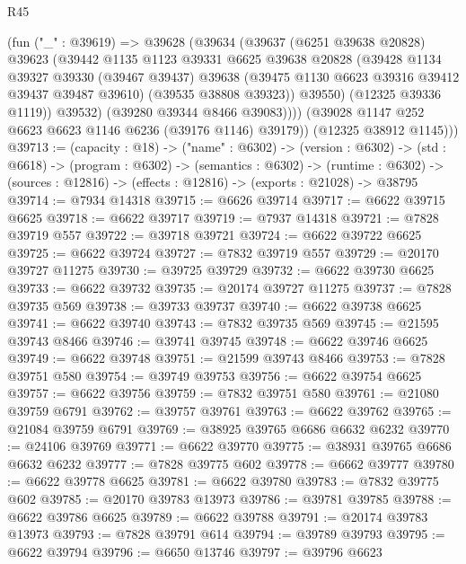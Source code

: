 \begin{lexlean}{R45}
\begin{coremodule}
{              (fun ("_" : @39619) =>
              @39628
                (@39634
                  (@39637
                    (@6251 @39638 @20828)
                    @39623
                    (@39442
                      @1135
                      @1123
                      @39331
                      @6625
                      @39638
                      @20828
                      (@39428
                        @1134
                        @39327
                        @39330
                        (@39467 @39437)
                        @39638
                        (@39475 @1130 @6623 @39316 @39412 @39437 @39487 @39610)
                        (@39535 @38808 @39323))
                      @39550)
                    (@12325 @39336 @1119))
                  @39532)
                (@39280 @39344 @8466 @39083))))
          (@39028 @1147 @252 @6623 @6623 @1146 @6236 (@39176 @1146) @39179))
        (@12325 @38912 @1145)))
@39713 := (capacity : @18) ->
  ("name" : @6302) ->
  (version : @6302) ->
  (std : @6618) ->
  (program : @6302) ->
  (semantics : @6302) ->
  (runtime : @6302) -> (sources : @12816) -> (effects : @12816) -> (exports : @21028) -> @38795
@39714 := @7934 @14318
@39715 := @6626 @39714
@39717 := @6622 @39715 @6625
@39718 := @6622 @39717
@39719 := @7937 @14318
@39721 := @7828 @39719 @557
@39722 := @39718 @39721
@39724 := @6622 @39722 @6625
@39725 := @6622 @39724
@39727 := @7832 @39719 @557
@39729 := @20170 @39727 @11275
@39730 := @39725 @39729
@39732 := @6622 @39730 @6625
@39733 := @6622 @39732
@39735 := @20174 @39727 @11275
@39737 := @7828 @39735 @569
@39738 := @39733 @39737
@39740 := @6622 @39738 @6625
@39741 := @6622 @39740
@39743 := @7832 @39735 @569
@39745 := @21595 @39743 @8466
@39746 := @39741 @39745
@39748 := @6622 @39746 @6625
@39749 := @6622 @39748
@39751 := @21599 @39743 @8466
@39753 := @7828 @39751 @580
@39754 := @39749 @39753
@39756 := @6622 @39754 @6625
@39757 := @6622 @39756
@39759 := @7832 @39751 @580
@39761 := @21080 @39759 @6791
@39762 := @39757 @39761
@39763 := @6622 @39762
@39765 := @21084 @39759 @6791
@39769 := @38925 @39765 @6686 @6632 @6232
@39770 := @24106 @39769
@39771 := @6622 @39770
@39775 := @38931 @39765 @6686 @6632 @6232
@39777 := @7828 @39775 @602
@39778 := @6662 @39777
@39780 := @6622 @39778 @6625
@39781 := @6622 @39780
@39783 := @7832 @39775 @602
@39785 := @20170 @39783 @13973
@39786 := @39781 @39785
@39788 := @6622 @39786 @6625
@39789 := @6622 @39788
@39791 := @20174 @39783 @13973
@39793 := @7828 @39791 @614
@39794 := @39789 @39793
@39795 := @6622 @39794
@39796 := @6650 @13746
@39797 := @39796 @6623
}
\end{coremodule}
\end{lexlean}
